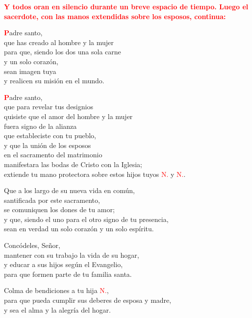 \documentclass[12pt, letterpaper]{report}
\begin{document}
\large{\bfseries \textcolor{red}{Y todos oran en silencio durante un breve espacio de tiempo. Luego el sacerdote, con las manos extendidas sobre los esposos, continua:}}

\lettrine[lines=1]{\bfseries \textcolor{red}{P}}{}\Large adre santo, \\
que has creado al hombre y la mujer \\
para que, siendo los dos una sola carne \\
y un solo coraz\'on, \\
sean imagen tuya \\
y realicen su misi\'on en el mundo.

\lettrine[lines=1]{\bfseries \textcolor{red}{P}}{}\Large adre santo, \\
que para revelar tus designios \\
quisiste que el amor del hombre y la mujer \\
fuera signo de la alianza \\
que estableciste con tu pueblo, \\
y que la uni\'on de los esposos \\
en el sacramento del matrimonio \\
manifestara las bodas de Cristo con la Iglesia; \\
extiende tu mano protectora sobre estos hijos tuyos \textcolor{red}{N.} y \textcolor{red}{N.}. \newline

Que a los largo de su nueva vida en com\'un, \\
santificada por este sacramento, \\
se comuniquen los dones de tu amor; \\
y que, siendo el uno para el otro signo de tu presencia, \\
sean en verdad un solo coraz\'on y un solo esp\'iritu. \newline

Conc\'odeles, Se\~nor, \\
mantener con su trabajo la vida de su hogar, \\
y educar a sus hijos seg\'un el Evangelio, \\
para que formen parte de tu familia santa. \newline

Colma de bendiciones a tu hija \textcolor{red}{N.}, \\
para que pueda cumplir sus deberes de esposa y madre, \\
y sea el alma y la alegr\'ia del hogar. \newline
\end{document}
